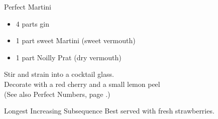 \begin{algorithm}{Perfect Martini}
\desc
\begin{itemize}
\item 4 parts gin
\item 1 part sweet Martini (sweet vermouth)
\item 1 part Noilly Prat (dry vermouth)
\end{itemize}
Stir and strain into a cocktail glass.\\
Decorate with a red cherry and a small lemon peel\\
(See also Perfect Numbers, page \pageref{perfnum}.)
\end{algorithm}

\begin{algorithm}{Longest Increasing Subsequence}
\desc Best served with fresh strawberries.
\end{algorithm}

